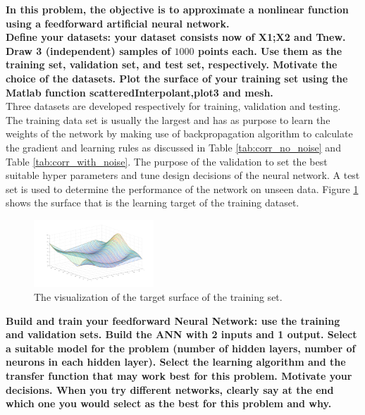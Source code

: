 \documentclass[a4paper,10pt]{article}
\begin{document}
\textbf{In this problem, the objective is to approximate a nonlinear function using a feedforward artificial neural network.}\\
\textbf{Define your datasets: your dataset consists now of X1;X2 and Tnew. Draw 3 (independent) samples of $ 1 000 $ 	points each. Use them as the training set, validation set, and test set, respectively. Motivate the choice of the 	datasets. Plot the surface of your training set using the Matlab function scatteredInterpolant,plot3 	and mesh.}\\

Three datasets are developed respectively for training, validation and testing. The training data set is usually the largest and has as purpose to learn the weights of the network by making use of backpropagation algorithm to calculate the gradient and learning rules as discussed in Table \ref{tab:corr_no_noise} and Table \ref{tab:corr_with_noise}. The purpose of the validation to set the best suitable hyper parameters and tune design decisions of the neural network. A test set is used to determine the performance of the network on unseen data. Figure \ref{fig:surface} shows the surface that is the learning target of the training dataset. 

\begin{figure}[h!]
	\centering
	\includegraphics[width=0.4\textwidth]{surface.png}
	\caption{The visualization of the target surface of the training set.}
	\label{fig:surface}
\end{figure}


\textbf{Build and train your feedforward Neural Network: use the training and validation sets. Build the ANN with 2
	inputs and 1 output. Select a suitable model for the problem (number of hidden layers, number of neurons in
	each hidden layer). Select the learning algorithm and the transfer function that may work best for this problem.
	Motivate your decisions. When you try different networks, clearly say at the end which one you would select as
	the best for this problem and why.}\\
\end{document}
